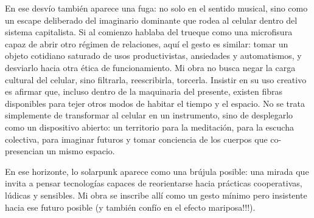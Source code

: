 \documentclass[spanish]{report}
\begin{document}
En ese desvío también aparece una fuga: no solo en el sentido musical, sino como un escape deliberado del imaginario dominante que rodea al celular dentro del sistema capitalista. Si al comienzo hablaba del trueque como una microfisura capaz de abrir otro régimen de relaciones, aquí el gesto es similar: tomar un objeto cotidiano saturado de usos productivistas, ansiedades y automatismos, y desviarlo hacia otra ética de funcionamiento. Mi obra no busca negar la carga cultural del celular, sino filtrarla, reescribirla, torcerla. Insistir en su uso creativo es afirmar que, incluso dentro de la maquinaria del presente, existen fibras disponibles para tejer otros modos de habitar el tiempo y el espacio. No se trata simplemente de transformar al celular en un instrumento, sino de desplegarlo como un dispositivo abierto: un territorio para la meditación, para la escucha colectiva, para imaginar futuros y tomar conciencia de los cuerpos que co-presencian un mismo espacio.

En ese horizonte, lo solarpunk aparece como una brújula posible: una mirada que invita a pensar tecnologías capaces de reorientarse hacia prácticas cooperativas, lúdicas y sensibles. Mi obra se inscribe allí como un gesto mínimo pero insistente hacia ese futuro posible (y también confío en el efecto mariposa!!!).
\end{document}
